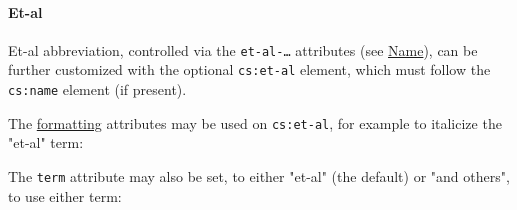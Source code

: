 \begin{Shaded}
\begin{Highlighting}[]
\NormalTok{\textless{}}\NormalTok{\textgreater{}}
\NormalTok{  \textless{}}\NormalTok{\textgreater{}}
\NormalTok{    \textless{}}\NormalTok{/\textgreater{}}
\NormalTok{  \textless{}/}\NormalTok{\textgreater{}}
\NormalTok{\textless{}/}\NormalTok{\textgreater{}}
\end{Highlighting}
\end{Shaded}

\hypertarget{et-al}{%
\paragraph{Et-al}\label{et-al}}

Et-al abbreviation, controlled via the \texttt{et-al-…} attributes (see
\protect\hyperlink{name}{Name}), can be further customized with the
optional \texttt{cs:et-al} element, which must follow the
\texttt{cs:name} element (if present).

The \protect\hyperlink{formatting}{formatting} attributes may be used on
\texttt{cs:et-al}, for example to italicize the "et-al" term:

\begin{Shaded}
\begin{Highlighting}[]
\NormalTok{\textless{}}\NormalTok{\textgreater{}}
\NormalTok{  \textless{}}\NormalTok{/\textgreater{}}
\NormalTok{\textless{}/}\NormalTok{\textgreater{}}
\end{Highlighting}
\end{Shaded}

The \texttt{term} attribute may also be set, to either "et-al" (the
default) or "and others", to use either term:

\begin{Shaded}
\begin{Highlighting}[]
\NormalTok{\textless{}}\NormalTok{\textgreater{}}
\NormalTok{  \textless{}}\NormalTok{/\textgreater{}}
\NormalTok{\textless{}/}\NormalTok{\textgreater{}}
\end{Highlighting}
\end{Shaded}

